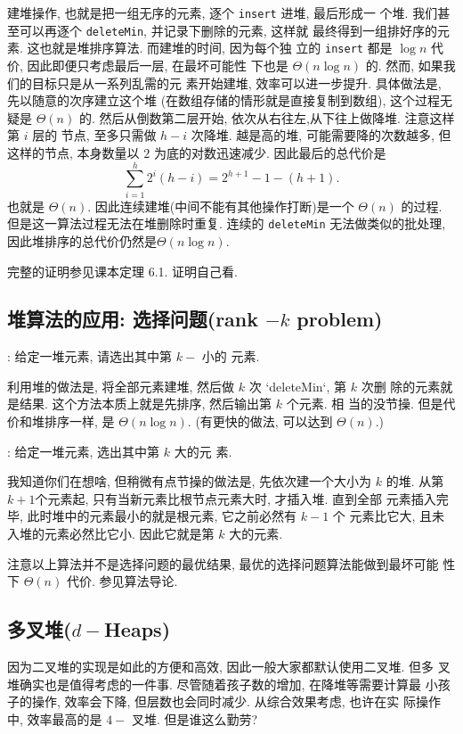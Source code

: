 \documentclass[a4paper]{ctexart}
\theoremstyle{definition}
\theoremstyle{definition}
\begin{document}

建堆操作, 也就是把一组无序的元素, 逐个 \verb|insert| 进堆, 最后形成一
个堆. 我们甚至可以再逐个 \verb|deleteMin|, 并记录下删除的元素, 这样就
最终得到一组排好序的元素. 这也就是堆排序算法. 而建堆的时间, 因为每个独
立的 \verb|insert| 都是 $\log n$ 代价, 因此即便只考虑最后一层, 在最坏可能性
下也是 $\Theta(n \log n)$ 的. 然而, 如果我们的目标只是从一系列乱需的元
素开始建堆, 效率可以进一步提升. 具体做法是, 先以随意的次序建立这个堆
(在数组存储的情形就是直接复制到数组), 这个过程无疑是 $\Theta(n)$ 的.
然后从倒数第二层开始, 依次从右往左,从下往上做降堆. 注意这样第 $i$ 层的
节点, 至多只需做 $h - i$ 次降堆. 越是高的堆, 可能需要降的次数越多, 但
这样的节点, 本身数量以 $2$ 为底的对数迅速减少. 因此最后的总代价是
$$ 
\sum_{i = 1}^h 2^i(h - i) =
2^{h + 1} - 1 - (h + 1).
$$
也就是 $\Theta(n)$. 因此连续建堆(中间不能有其他操作打断)是一个
$\Theta(n)$ 的过程. 但是这一算法过程无法在堆删除时重复. 连续的
\verb|deleteMin| 无法做类似的批处理, 因此堆排序的总代价仍然是$\Theta(n
\log n)$.

完整的证明参见课本定理 6.1. 证明自己看.

\subsection{堆算法的应用: 选择问题(rank $-k$ problem) }

: 给定一堆元素, 请选出其中第 $k-$ 小的
元素.

利用堆的做法是, 将全部元素建堆, 然后做 $k$ 次 `deleteMin`, 第 $k$ 次删
除的元素就是结果. 这个方法本质上就是先排序, 然后输出第 $k$ 个元素. 相
当的没节操. 但是代价和堆排序一样, 是 $\Theta(n \log n)$. (有更快的做法,
可以达到 $\Theta(n)$.)

: 给定一堆元素, 选出其中第 $k$ 大的元
素.

我知道你们在想啥, 但稍微有点节操的做法是, 先依次建一个大小为 $k$ 的堆.
从第 $k + 1$个元素起, 只有当新元素比根节点元素大时, 才插入堆. 直到全部
元素插入完毕, 此时堆中的元素最小的就是根元素, 它之前必然有 $k - 1$ 个
元素比它大, 且未入堆的元素必然比它小. 因此它就是第 $k$ 大的元素.

注意以上算法并不是选择问题的最优结果, 最优的选择问题算法能做到最坏可能
性下 $\Theta(n)$ 代价. 参见算法导论. 

\subsection{多叉堆($d-$Heaps)}
因为二叉堆的实现是如此的方便和高效, 因此一般大家都默认使用二叉堆. 但多
叉堆确实也是值得考虑的一件事. 尽管随着孩子数的增加, 在降堆等需要计算最
小孩子的操作, 效率会下降, 但层数也会同时减少. 从综合效果考虑, 也许在实
际操作中, 效率最高的是 $4-$ 叉堆. 但是谁这么勤劳?
\end{document}
